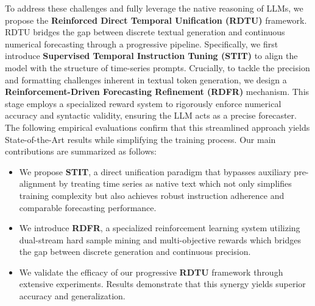 To address these challenges and fully leverage the native reasoning of LLMs, we propose the \textbf{Reinforced Direct Temporal Unification (RDTU)} framework. RDTU bridges the gap between discrete textual generation and continuous numerical forecasting through a progressive pipeline. Specifically, we first introduce \textbf{Supervised Temporal Instruction Tuning (STIT)} to align the model with the structure of time-series prompts. Crucially, to tackle the precision and formatting challenges inherent in textual token generation, we design a \textbf{Reinforcement-Driven Forecasting Refinement (RDFR)} mechanism. This stage employs a specialized reward system to rigorously enforce numerical accuracy and syntactic validity, ensuring the LLM acts as a precise forecaster. The following empirical evaluations confirm that this streamlined approach yields State-of-the-Art results while simplifying the training process. Our main contributions are summarized as follows:

\begin{itemize}
    \item We propose \textbf{STIT}, a direct unification paradigm that bypasses auxiliary pre-alignment by treating time series as native text which not only simplifies training complexity but also achieves robust instruction adherence and comparable forecasting performance.

    \item We introduce \textbf{RDFR}, a specialized reinforcement learning system utilizing dual-stream hard sample mining and multi-objective rewards which bridges the gap between discrete generation and continuous precision.

    \item We validate the efficacy of our progressive \textbf{RDTU} framework through extensive experiments. Results demonstrate that this synergy yields superior accuracy and generalization.

\end{itemize}
